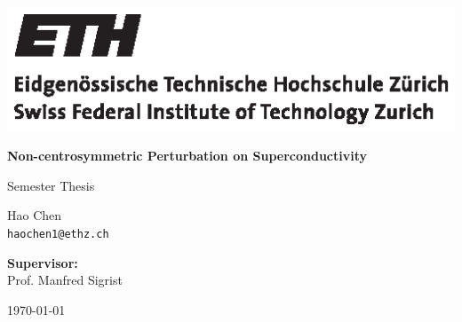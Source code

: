 \documentclass[11pt]{article}
\begin{document}

\newcommand{\bra}[1]{\left \langle #1 \right \rvert}
\newcommand{\ket}[1]{\left \rvert #1 \right \rangle}
\newcommand{\up}{\uparrow}
\newcommand{\down}{\downarrow}

 \begin{titlepage}%
		\noindent
		\includegraphics[viewport=8 0 185 55]{figures/eth_logo_black} \hfill
		\vspace{3cm}

		\let\footnotesize\small
		\let\footnoterule\relax
		\let \footnote \thanks


        \begin{center}
			\begin{spacing}{1.8}
			  {\huge \bfseries Non-centrosymmetric Perturbation on Superconductivity}
			\end{spacing}

            \large Semester Thesis
		\end{center}
		\vspace{0.4cm}

		\begin{center}
			\large
            Hao Chen\\
			\texttt{\small haochen1@ethz.ch}
		\end{center}%

		\vspace{0.4cm}

		\vspace{1cm}


		\vfill
		\begin{center}
			\textbf{Supervisor:} \\[2pt] Prof. Manfred Sigrist
		\end{center}

		\vspace{0.2cm}

		\begin{center}
            \today
		\end{center}
\end{titlepage}%
\end{document}
